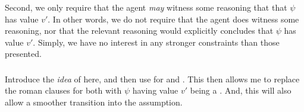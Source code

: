 \begin{note}
  Second, we only require that the agent \emph{may} witness some reasoning that \emph{} that \(\psi\) has value \(v'\).
  In other words, we do not require that the agent does witness some reasoning, nor that the relevant reasoning would explicitly concludes that \(\psi\) has value \(v'\).
  Simply, we have no interest in any stronger constraints than those presented.
\end{note}

\subsubsection{}
\label{sec:requ-idea}

\begin{note}
  \color{red}
  Introduce the \emph{idea} of  here, and then use for \ideaCS{} and \ideaCSC{}.
  This then allows me to replace the roman clauses for both with \(\psi\) having value \(v'\) being a \requ{}.
  And, this will also allow a smoother transition into the assumption.
\end{note}

